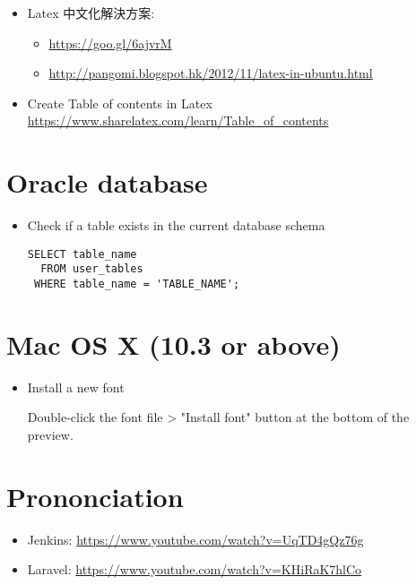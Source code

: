 \documentclass{article}
\begin{document}
\begin{itemize}
\item Latex 中文化解決方案:
  \begin{itemize}
    \item \href{https://goo.gl/6ajvrM}{https://goo.gl/6ajvrM}
    \item \href{http://pangomi.blogspot.hk/2012/11/latex-in-ubuntu.html}{http://pangomi.blogspot.hk/2012/11/latex-in-ubuntu.html}
  \end{itemize}
\item Create Table of contents in Latex \href{https://www.sharelatex.com/learn/Table\_of\_contents}{https://www.sharelatex.com/learn/Table\_of\_contents}
\end{itemize}

\section{Oracle database}
\begin{itemize}
\item Check if a table exists in the current database schema
\begin{lstlisting}
SELECT table_name
  FROM user_tables
 WHERE table_name = 'TABLE_NAME';
\end{lstlisting}
\end{itemize}

\section{Mac OS X (10.3 or above)}
\begin{itemize}
\item Install a new font
  \begin{itemize}
    Double-click the font file > "Install font" button at the bottom of the preview.
  \end{itemize}
\end{itemize}

\section{Prononciation}

\begin{itemize}
\item Jenkins: \href{https://www.youtube.com/watch?v=UqTD4gQz76g}{https://www.youtube.com/watch?v=UqTD4gQz76g}
\item Laravel: \href{https://www.youtube.com/watch?v=KHiRaK7hlCo}{https://www.youtube.com/watch?v=KHiRaK7hlCo}
\end{itemize}
\end{document}
